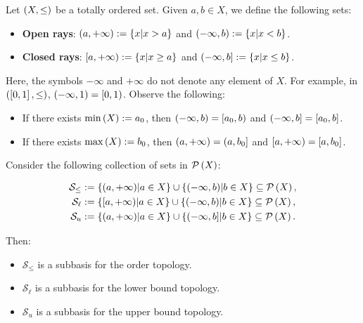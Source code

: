 \begin{example}
  Let $\left(X,\leq\right)$ be a totally ordered set. Given $a,b\in X$, we define the following sets:

  \begin{itemize}
    \item \textbf{Open rays}: $\left(a,+\infty\right):=\left\{x\middle|x>a\right\}$ and $\left(-\infty,b\right):=\left\{x\middle|x<b\right\}$.
    \item \textbf{Closed rays}: $\left[a,+\infty\right):=\left\{x\middle|x\geq a\right\}$ and $\left(-\infty,b\right]:=\left\{x\middle|x\leq b\right\}$.
  \end{itemize}

  Here, the symbols $-\infty$ and $+\infty$ do not denote any element of $X$. For example, in $\left(\left[0,1\right],\leq\right)$, $\left(-\infty,1\right)=\left[0,1\right)$. Observe the following:

  \begin{itemize}
    \item If there exists $\min\left(X\right):=a_0$, then $\left(-\infty,b\right)=\left[a_0,b\right)$ and $\left(-\infty,b\right]=\left[a_0,b\right]$.
    \item If there exists $\max\left(X\right):=b_0$, then $\left(a,+\infty\right)=\left(a,b_0\right]$ and $\left[a,+\infty\right)=\left[a,b_0\right]$.
  \end{itemize}
  
  Consider the following collection of sets in $\mathcal{P}\left(X\right)$:
  
  \begin{equation}
    \begin{split}
      \mathcal{S}_{\leq} & := \left\{\left(a,+\infty\right)\middle|a\in X\right\}\cup\left\{\left(-\infty,b\right)\middle|b\in X\right\}\subseteq\mathcal{P}\left(X\right),\\
      \mathcal{S}_{\ell} & := \left\{\left[a,+\infty\right)\middle|a\in X\right\}\cup\left\{\left(-\infty,b\right)\middle|b\in X\right\}\subseteq\mathcal{P}\left(X\right),\\
      \mathcal{S}_{u} & := \left\{\left(a,+\infty\right)\middle|a\in X\right\}\cup\left\{\left(-\infty,b\right]\middle|b\in X\right\}\subseteq\mathcal{P}\left(X\right).
    \end{split}
  \end{equation}
  
  Then:
  
  \begin{itemize}
    \item $\mathcal{S}_{\leq}$ is a subbasis for the order topology.
    \item $\mathcal{S}_{\ell}$ is a subbasis for the lower bound topology.
    \item $\mathcal{S}_{u}$ is a subbasis for the upper bound topology.
  \end{itemize}
\end{example}

